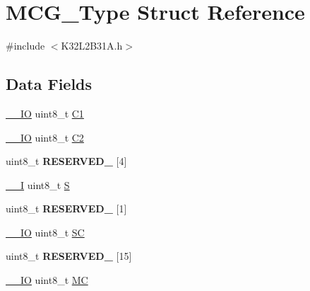 \hypertarget{struct_m_c_g___type}{}\section{M\+C\+G\+\_\+\+Type Struct Reference}
\label{struct_m_c_g___type}


{\ttfamily \#include $<$K32\+L2\+B31\+A.\+h$>$}

\subsection*{Data Fields}
\begin{DoxyCompactItemize}
\item 
\mbox{\hyperlink{core__cm0plus_8h_aec43007d9998a0a0e01faede4133d6be}{\+\_\+\+\_\+\+IO}} uint8\+\_\+t \mbox{\hyperlink{struct_m_c_g___type_ad54aa92be9fc988e74d55d2d3daae8ad}{C1}}
\item 
\mbox{\hyperlink{core__cm0plus_8h_aec43007d9998a0a0e01faede4133d6be}{\+\_\+\+\_\+\+IO}} uint8\+\_\+t \mbox{\hyperlink{struct_m_c_g___type_a4f920936a8fc32483b3ebd9b0674b450}{C2}}
\item 
\mbox{\label{struct_m_c_g___type_a71277aaa40be4473ac2521981f273bd3}} 
uint8\+\_\+t {\bfseries R\+E\+S\+E\+R\+V\+E\+D\+\_} \mbox{[}4\mbox{]}
\item 
\mbox{\hyperlink{core__cm0plus_8h_af63697ed9952cc71e1225efe205f6cd3}{\+\_\+\+\_\+I}} uint8\+\_\+t \mbox{\hyperlink{struct_m_c_g___type_ac8db14da050fcf50b52dc461c601cf95}{S}}
\item 
\mbox{\label{struct_m_c_g___type_a83b2d6f5756a9b0aa609216190380d5f}} 
uint8\+\_\+t {\bfseries R\+E\+S\+E\+R\+V\+E\+D\+\_} \mbox{[}1\mbox{]}
\item 
\mbox{\hyperlink{core__cm0plus_8h_aec43007d9998a0a0e01faede4133d6be}{\+\_\+\+\_\+\+IO}} uint8\+\_\+t \mbox{\hyperlink{struct_m_c_g___type_a369ca7d5284929a823dab79b7d10d81f}{SC}}
\item 
\mbox{\label{struct_m_c_g___type_a82a8a8cde660b0324c3e5da5e5f1970c}} 
uint8\+\_\+t {\bfseries R\+E\+S\+E\+R\+V\+E\+D\+\_} \mbox{[}15\mbox{]}
\item 
\mbox{\hyperlink{core__cm0plus_8h_aec43007d9998a0a0e01faede4133d6be}{\+\_\+\+\_\+\+IO}} uint8\+\_\+t \mbox{\hyperlink{struct_m_c_g___type_a092532c18bb122f73d67ea2ea2ee2d1a}{MC}}
\end{DoxyCompactItemize}


